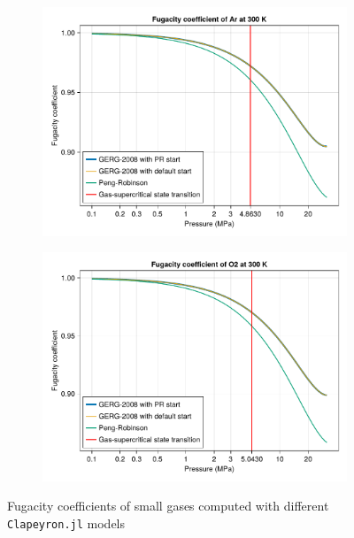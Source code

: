 \documentclass[main.tex]{subfiles}
\begin{document}
\begin{figure}
	\begin{subfigure}{0.5\columnwidth}
		\includegraphics[width=\columnwidth]{figures/gcmc/fugacity_Ar.pdf}
	\end{subfigure}\hfill%
	\begin{subfigure}{0.5\columnwidth}
		\includegraphics[width=\columnwidth]{figures/gcmc/fugacity_O2.pdf}
	\end{subfigure}

	\caption{Fugacity coefficients of small gases computed with different \texttt{Clapeyron.jl} models}\label{fugacity}
\end{figure}
\end{document}

